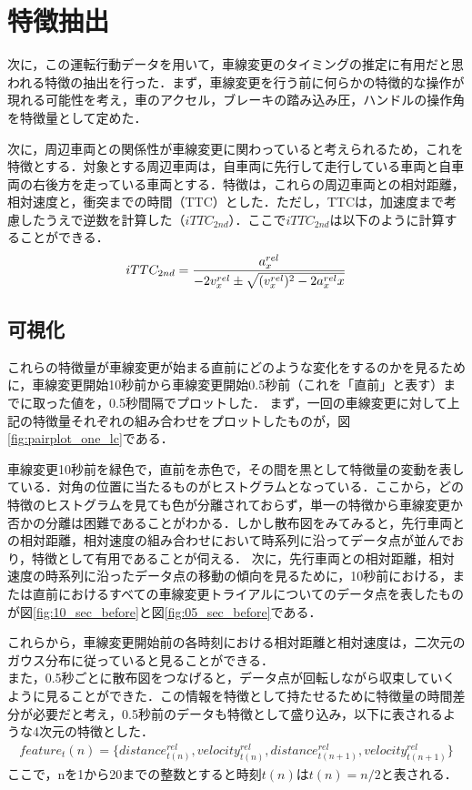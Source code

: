 \section{特徴抽出}
次に，この運転行動データを用いて，車線変更のタイミングの推定に有用だと思われる特徴の抽出を行った．まず，車線変更を行う前に何らかの特徴的な操作が現れる可能性を考え，車のアクセル，ブレーキの踏み込み圧，ハンドルの操作角を特徴量として定めた．
\par
次に，周辺車両との関係性が車線変更に関わっていると考えられるため，これを特徴とする．対象とする周辺車両は，自車両に先行して走行している車両と自車両の右後方を走っている車両とする．特徴は，これらの周辺車両との相対距離，相対速度と，衝突までの時間（TTC）とした．ただし，TTCは，加速度まで考慮したうえで逆数を計算した（$iTTC_{2nd}$）．ここで$iTTC_{2nd}$は以下のように計算することができる．
\begin{align}
  iTTC_{2nd}=\frac{a_x^{rel}}{-2v_x^{rel}\pm\sqrt{(v_x^{rel})^2-2{a_x^{rel}}x}}
\end{align}



\subsection{可視化}
これらの特徴量が車線変更が始まる直前にどのような変化をするのかを見るために，車線変更開始10秒前から車線変更開始0.5秒前（これを「直前」と表す）までに取った値を，0.5秒間隔でプロットした．
まず，一回の車線変更に対して上記の特徴量それぞれの組み合わせをプロットしたものが，図\ref{fig:pairplot_one_lc}である．

車線変更10秒前を緑色で，直前を赤色で，その間を黒として特徴量の変動を表している．対角の位置に当たるものがヒストグラムとなっている．ここから，どの特徴のヒストグラムを見ても色が分離されておらず，単一の特徴から車線変更か否かの分離は困難であることがわかる．しかし散布図をみてみると，先行車両との相対距離，相対速度の組み合わせにおいて時系列に沿ってデータ点が並んでおり，特徴として有用であることが伺える．
次に，先行車両との相対距離，相対速度の時系列に沿ったデータ点の移動の傾向を見るために，10秒前における，または直前におけるすべての車線変更トライアルについてのデータ点を表したものが図\ref{fig:10_sec_before}と図\ref{fig:05_sec_before}である．

これらから，車線変更開始前の各時刻における相対距離と相対速度は，二次元のガウス分布に従っていると見ることができる．
\\
また，0.5秒ごとに散布図をつなげると，データ点が回転しながら収束していくように見ることができた．この情報を特徴として持たせるために特徴量の時間差分が必要だと考え，0.5秒前のデータも特徴として盛り込み，以下に表されるような4次元の特徴とした．
\begin{align}
  feature_t(n)=\{distance_{t(n)}^{rel},velocity_{t(n)}^{rel},distance_{t(n+1)}^{rel},velocity_{t(n+1)}^{rel}\}
\end{align}
ここで，nを1から20までの整数とすると時刻$t(n)$は$t(n) = n/2$と表される．
